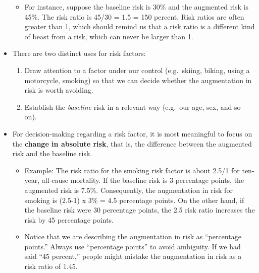 \documentclass[
  letterpaper,
  DIV=11,
  numbers=noendperiod,
  oneside]{scrartcl}
\providecommand{\tightlist}{%
  \setlength{\itemsep}{0pt}\setlength{\parskip}{0pt}}\usepackage{longtable,booktabs,array}
\begin{document}
\begin{itemize}
  \begin{itemize}
  \tightlist
  \item
    For instance, suppose the baseline risk is 30\% and the augmented
    risk is 45\%. The risk ratio is 45/30 = 1.5 = 150 percent. Risk
    ratios are often greater than 1, which should remind us that a risk
    ratio is a different kind of beast from a risk, which can never be
    larger than 1.
  \end{itemize}
\item
  There are two distinct uses for risk factors:

  \begin{enumerate}
  \def\labelenumi{\roman{enumi}.}
  \tightlist
  \item
    Draw attention to a factor under our control (e.g.~skiing, biking,
    using a motorcycle, smoking) so that we can decide whether the
    augmentation in risk is worth avoiding.
  \item
    Establish the \emph{baseline} risk in a relevant way (e.g.~our age,
    sex, and so on).
  \end{enumerate}
\item
  For decision-making regarding a risk factor, it is most meaningful to
  focus on the \textbf{change in absolute risk}, that is, the difference
  between the augmented risk and the baseline risk.

  \begin{itemize}
  \tightlist
  \item
    Example: The risk ratio for the smoking risk factor is about 2.5/1
    for ten-year, all-cause mortality. If the baseline risk is 3
    percentage points, the augmented risk is 7.5\%. Consequently, the
    augmentation in risk for smoking is (2.5-1) x 3\% = 4.5 percentage
    points. On the other hand, if the baseline risk were 30 percentage
    points, the 2.5 risk ratio increases the risk by 45 percentage
    points.
  \item
    Notice that we are describing the augmentation in risk as
    ``percentage points.'' Always use ``percentage points'' to avoid
    ambiguity. If we had said ``45 percent,'' people might mistake the
    augmentation in risk as a risk ratio of 1.45.
  \end{itemize}
\end{itemize}
\end{document}
